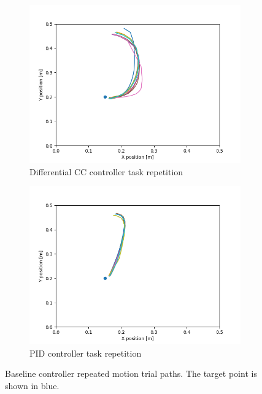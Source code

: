\begin{figure}[h]
     \centering
     \begin{subfigure}[b]{0.48\textwidth}
         \centering
         \includegraphics[width=\textwidth]{images/diff_cc_repetition.png}
         \caption{Differential CC controller task repetition}
         \label{fig:diff_cc_repetition}
     \end{subfigure}
     \hfill
     \begin{subfigure}[b]{0.48\textwidth}
         \centering
         \includegraphics[width=\textwidth]{images/pid_repetition.png}
         \caption{PID controller task repetition}
         \label{fig:pid_repetition}
     \end{subfigure}
        \caption{Baseline controller repeated motion trial paths. The target point is shown in blue.}
        \label{fig:repetition_trial}
\end{figure}


